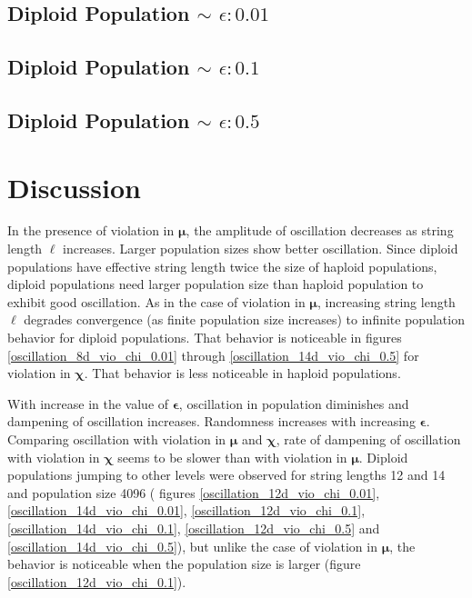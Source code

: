 \subsection{Diploid Population $\mathtt{\sim}$ $\epsilon: 0.01$}

\clearpage
\subsection{Diploid Population $\mathtt{\sim}$ $\epsilon: 0.1$}

\subsection{Diploid Population $\mathtt{\sim}$ $\epsilon: 0.5$}


\section{Discussion}
In the presence of violation in $\bm{\mu}$, the amplitude of oscillation decreases 
as string length $\ell$ increases. 
Larger population sizes show better oscillation. 
Since diploid populations have effective string length twice the size of haploid populations, 
diploid populations need larger population size than haploid population to exhibit good oscillation. 
As in the case of violation in $\bm{\mu}$, increasing string length $\ell$ 
degrades convergence (as finite population size increases) to infinite population behavior for diploid populations. 
That behavior is noticeable in figures 
\ref{oscillation_8d_vio_chi_0.01} through \ref{oscillation_14d_vio_chi_0.5} for violation in $\bm{\chi}$. 
That behavior is less noticeable in haploid populations.

With increase in the value of $\bm{\epsilon}$, 
oscillation in population diminishes and dampening of oscillation increases. 
Randomness increases with increasing $\bm{\epsilon}$.
Comparing oscillation with violation in $\bm{\mu}$ and $\bm{\chi}$, rate of dampening of oscillation with violation 
in $\bm{\chi}$ seems to be slower than with violation in ${\bm{\mu}}$. 
Diploid populations jumping to other levels 
were observed for string lengths 12 and 14 and population size 4096  ( 
figures \ref{oscillation_12d_vio_chi_0.01}, \ref{oscillation_14d_vio_chi_0.01}, \ref{oscillation_12d_vio_chi_0.1}, 
\ref{oscillation_14d_vio_chi_0.1}, \ref{oscillation_12d_vio_chi_0.5} and \ref{oscillation_14d_vio_chi_0.5}), 
but unlike the case of violation in $\bm{\mu}$, 
the behavior is noticeable when the population size is larger (figure \ref{oscillation_12d_vio_chi_0.1}). 

